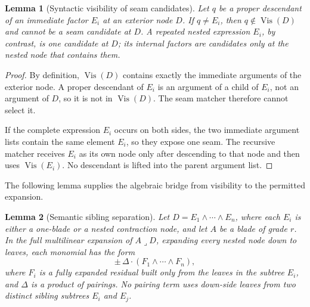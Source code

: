 \documentclass[11pt]{article}
\newtheorem{lemma}{Lemma}
\begin{document}
\begin{lemma}[Syntactic visibility of seam candidates]
\label{lem:syntactic-visibility}
Let \(q\) be a proper descendant of an immediate factor \(E_i\) at an exterior
node \(D\). If \(q\ne E_i\), then \(q\notin\operatorname{Vis}(D)\) and cannot
be a seam candidate at \(D\). A repeated nested expression \(E_i\), by
contrast, is one candidate at \(D\); its internal factors are candidates only
at the nested node that contains them.
\end{lemma}

\begin{proof}
By definition, \(\operatorname{Vis}(D)\) contains exactly the immediate
arguments of the exterior node. A proper descendant of \(E_i\) is an argument
of a child of \(E_i\), not an argument of \(D\), so it is not in
\(\operatorname{Vis}(D)\). The seam matcher therefore cannot select it.

If the complete expression \(E_i\) occurs on both sides, the two immediate
argument lists contain the same element \(E_i\), so they expose one seam.
The recursive matcher receives \(E_i\) as its own node only after descending
to that node and then uses \(\operatorname{Vis}(E_i)\). No descendant is
lifted into the parent argument list.
\end{proof}

The following lemma supplies the algebraic bridge from visibility to the
permitted expansion.

\begin{lemma}[Semantic sibling separation]
\label{lem:semantic-sibling-separation}
Let \(D=E_1\wedge\cdots\wedge E_n\), where each \(E_i\) is either a one-blade
or a nested contraction node, and let \(A\) be a blade of grade \(r\). In the
full multilinear expansion of \(A\mathbin{\lrcorner}D\), expanding every
nested node down to leaves, each monomial has the form
\[
\pm\,\Delta\cdot(F_1\wedge\cdots\wedge F_n),
\]
where \(F_i\) is a fully expanded residual built only from the leaves in the
subtree \(E_i\), and \(\Delta\) is a product of pairings. No pairing term uses
down-side leaves from two distinct sibling subtrees \(E_i\) and \(E_j\).
\end{lemma}
\end{document}
